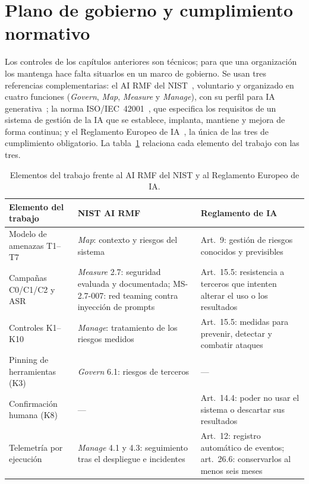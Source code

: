 \documentclass[11pt,a4paper]{article}
\newcommand{\atlas}[1]{\textsc{#1}}
\begin{document}
\section{Plano de gobierno y cumplimiento normativo}
\label{sec:gobierno}
Los controles de los capítulos anteriores son técnicos; para que una organización los mantenga hace falta
situarlos en un marco de gobierno. Se usan tres referencias complementarias: el \atlas{AI RMF} del
NIST~\cite{nist_ai_rmf}, voluntario y organizado en cuatro funciones (\emph{Govern}, \emph{Map}, \emph{Measure} y
\emph{Manage}), con su perfil para IA generativa~\cite{nist_ai_600_1}; la norma ISO/IEC~42001~\cite{iso42001},
que especifica los requisitos de un sistema de gestión de la IA que se establece, implanta, mantiene y mejora de
forma continua; y el Reglamento Europeo de IA~\cite{reglamento_ia}, la única de las tres de cumplimiento
obligatorio. La tabla~\ref{tab:gobierno} relaciona cada elemento del trabajo con las tres.

\begin{table}[h]\centering\footnotesize
\caption{Elementos del trabajo frente al AI RMF del NIST y al Reglamento Europeo de IA.}\label{tab:gobierno}
\begin{tabularx}{\textwidth}{>{\raggedright\arraybackslash}p{3.6cm}>{\raggedright\arraybackslash}X>{\raggedright\arraybackslash}X}
\toprule
Elemento del trabajo & NIST AI RMF & Reglamento de IA \\
\midrule
Modelo de amenazas T1--T7 & \emph{Map}: contexto y riesgos del sistema & Art.~9: gestión de riesgos conocidos y
previsibles \\
Campañas C0/C1/C2 y ASR & \emph{Measure} 2.7: seguridad evaluada y documentada; MS-2.7-007: red teaming contra
inyección de prompts & Art.~15.5: resistencia a terceros que intenten alterar el uso o los resultados \\
Controles K1--K10 & \emph{Manage}: tratamiento de los riesgos medidos & Art.~15.5: medidas para prevenir,
detectar y combatir ataques \\
Pinning de herramientas (K3) & \emph{Govern} 6.1: riesgos de terceros & --- \\
Confirmación humana (K8) & --- & Art.~14.4: poder no usar el sistema o descartar sus resultados \\
Telemetría por ejecución & \emph{Manage} 4.1 y 4.3: seguimiento tras el despliegue e incidentes & Art.~12:
registro automático de eventos; art.~26.6: conservarlos al menos seis meses \\
\bottomrule
\end{tabularx}
\end{table}
\end{document}
